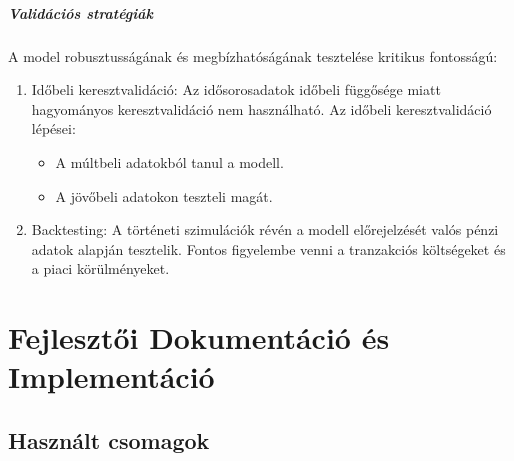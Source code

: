 \documentclass[11pt]{article}
\providecommand{\tightlist}{%
      \setlength{\itemsep}{0pt}\setlength{\parskip}{0pt}}
\begin{document}
\subparagraph{Validációs
stratégiák}\label{validuxe1ciuxf3s-stratuxe9giuxe1k}

A model robusztusságának és megbízhatóságának tesztelése kritikus
fontosságú:

\begin{enumerate}
\def\labelenumi{\arabic{enumi}.}
\tightlist
\item
  Időbeli keresztvalidáció: Az idősorosadatok időbeli függősége miatt
  hagyományos keresztvalidáció nem használható. Az időbeli
  keresztvalidáció lépései:

  \begin{itemize}
  \tightlist
  \item
    A múltbeli adatokból tanul a modell.
  \item
    A jövőbeli adatokon teszteli magát.
  \end{itemize}
\item
  Backtesting: A történeti szimulációk révén a modell előrejelzését
  valós pénzi adatok alapján tesztelik. Fontos figyelembe venni a
  tranzakciós költségeket és a piaci körülményeket.
\end{enumerate}

    \section{Fejlesztői Dokumentáció és
Implementáció}\label{fejlesztux151i-dokumentuxe1ciuxf3-uxe9s-implementuxe1ciuxf3}

    \subsection{Használt csomagok}\label{hasznuxe1lt-csomagok}
\end{document}
